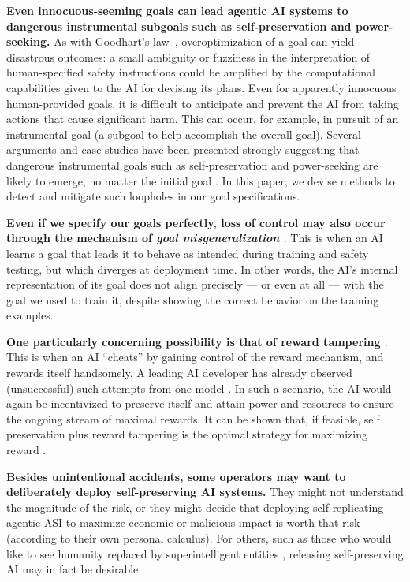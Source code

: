 \textbf{Even innocuous-seeming goals can lead agentic AI systems to dangerous instrumental subgoals such as self-preservation and power-seeking.} As with Goodhart's law~\cite{link.springer.com.chapter.10.1007.978.1.349.17295.5.4}, overoptimization of a goal can yield disastrous outcomes: a small ambiguity or fuzziness in the interpretation of human-specified safety instructions could be amplified by the computational capabilities given to the AI for devising its plans. Even for apparently innocuous human-provided goals, it is difficult to anticipate and prevent the AI from taking actions that cause significant harm. This can occur, for example, in pursuit of an instrumental goal (a subgoal to help accomplish the overall goal).  Several arguments and case studies have been presented strongly suggesting that dangerous instrumental goals such as self-preservation and power-seeking are likely to emerge, no matter the initial goal \cite{link.springer.com.article.10.1007.s11023.012.9281.3,dl.acm.org.doi.10.5555.1566174.1566226}. In this paper, we devise methods to detect and mitigate such loopholes in our goal specifications.

\textbf{Even if we specify our goals perfectly, loss of control may also occur through the mechanism of \emph{goal misgeneralization} \cite{arxiv.org.abs.2210.01790}}. This is when an AI learns a goal that leads it to behave as intended during training and safety testing, but which diverges at deployment time. In other words, the AI’s internal representation of its goal does not align precisely --– or even at all --– with the goal we used to train it, despite showing the correct behavior on the training examples.

\textbf{One particularly concerning possibility is that of reward tampering \cite{arxiv.org.abs.2406.10162}}. This is when an AI ``cheats'' by gaining control of the reward mechanism, and rewards itself handsomely. A leading AI developer has already observed (unsuccessful) such attempts from one model \cite{arxiv.org.abs.2406.10162}. In such a scenario, the AI would again be incentivized to preserve itself and attain power and resources to ensure the ongoing stream of maximal rewards. It can be shown that, if feasible, self preservation plus reward tampering is the optimal strategy for maximizing reward \cite{ojs.aaai.org.aimagazine.index.php.aimagazine.article.view.15084}. 

\textbf{Besides unintentional accidents, some operators may want to deliberately deploy self-preserving AI systems.}  They might not understand the magnitude of the risk, or they might decide that deploying self-replicating agentic ASI to maximize economic or malicious impact is worth that risk (according to their own personal calculus).
For others, such as those who would like to see humanity replaced by superintelligent entities \cite{arxiv.org.abs.2306.12001}, releasing self-preserving AI may in fact be desirable.

